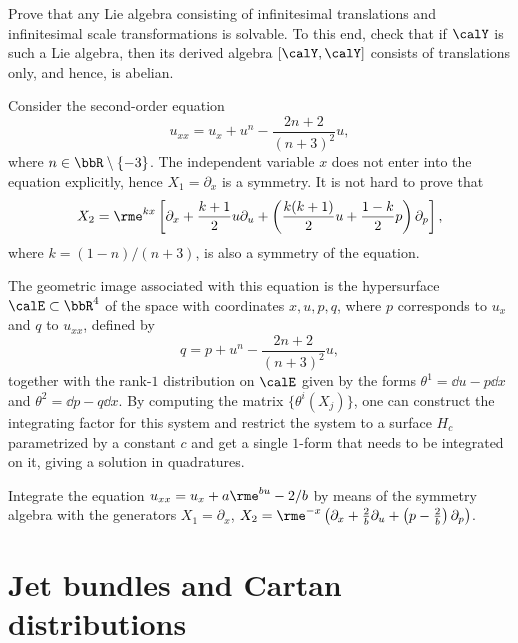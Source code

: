 \begin{xca}
    Prove that any Lie algebra consisting of infinitesimal translations and infinitesimal scale transformations is solvable. To this end, check that if $\calY$ is such a Lie algebra, then its derived algebra $[\calY,\calY]$ consists of translations only, and hence, is abelian.
\end{xca}


\begin{example}
    Consider the second-order equation 
    \[u_{xx}=u_x+u^n-\frac{2n+2}{(n+3)^2}u,\]
    where $n\in\bbR\setminus\{-3\}$. The independent variable $x$ does not enter into the equation explicitly, hence $X_1=\partial_x$  is a symmetry. It is not hard to prove that 
    \[X_2=\rme^{kx}\left[\partial_x+\frac{k+1}{2}u\partial_u+\left(\frac{k(k+1)}{2}u+\frac{1-k}{2}p\right)\partial_p\right],\]
    where $k=(1-n)/(n+3)$, is also a symmetry of the equation.

    The geometric image associated with this equation is the hypersurface $\calE\subset\bbR^4$ of the space with coordinates $x,u,p,q$, where $p$ corresponds to $u_x$ and $q$ to $u_{xx}$, defined by 
    \[q=p+u^n-\frac{2n+2}{(n+3)^2}u,\]
    together with the rank-$1$ distribution on $\calE$ given by the forms $\theta^1=\dd u-p\dd x$ and $\theta^2=\dd p-q\dd x$. By computing the matrix $\{\theta^i(X_j)\}$, one can construct the integrating factor for this system and restrict the system to a surface $H_c$ parametrized by a constant $c$ and get a single $1$-form that needs to be integrated on it, giving a solution in quadratures.
\end{example}


\begin{xca}
    Integrate the equation $u_{xx}=u_x+a\rme^{bu}-2/b$ by means of the symmetry algebra with the generators $X_1=\partial_x$, $X_2=\rme^{-x}\left(\partial_x+\frac{2}{b}\partial_u+\left(p-\frac{2}{b}\right)\partial_p\right)$.
\end{xca}







\section{Jet bundles and Cartan distributions}


